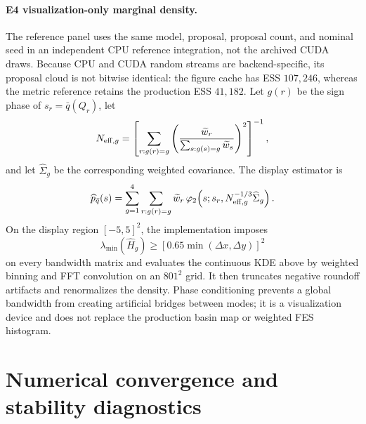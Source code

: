 \documentclass[11pt]{article}
\begin{document}
\paragraph{E4 visualization-only marginal density.}
The reference panel uses the same model, proposal, proposal count, and nominal
seed in an independent CPU reference integration, not the archived CUDA
draws.  Because CPU and CUDA random streams are backend-specific, its proposal
cloud is not bitwise identical: the figure cache has ESS $107{,}246$, whereas
the metric reference retains the production ESS $41{,}182$.  Let $g(r)$ be the
sign phase of $s_r=\bar q(Q_r)$, let
\begin{equation}
 N_{{\rm eff},g}
 =\left[\sum_{r:g(r)=g}
 \left(\frac{\widetilde w_r}{\sum_{s:g(s)=g}\widetilde w_s}\right)^2
 \right]^{-1},
\end{equation}
and let $\widehat\Sigma_g$ be the corresponding weighted covariance.  The
display estimator is
\begin{equation}
 \widehat p_{\bar q}(s)
 =\sum_{g=1}^{4}\sum_{r:g(r)=g}
 \widetilde w_r\,
 \varphi_2\!\left(s;s_r,
 N_{{\rm eff},g}^{-1/3}\widehat\Sigma_g\right).
\end{equation}
On the display region $[-5,5]^2$, the implementation imposes
\begin{equation}
 \lambda_{\min}(\widehat H_g)
 \ge [0.65\min(\Delta x,\Delta y)]^2
\end{equation}
on every bandwidth matrix and evaluates the continuous KDE above by weighted
binning and FFT convolution on an $801^2$ grid.  It then truncates
negative roundoff artifacts and renormalizes the density.  Phase conditioning
prevents a global bandwidth from creating artificial bridges between modes;
it is a visualization device and does not replace the production basin map or
weighted FES histogram.

\section{Numerical convergence and stability diagnostics}
\label{app:stability}
\end{document}
